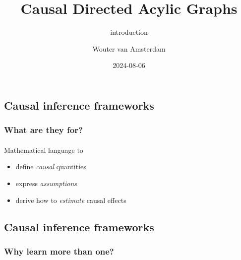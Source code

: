 \documentclass[
  letterpaper,
  DIV=11,
  numbers=noendperiod]{scrartcl}
\title{Causal Directed Acylic Graphs}
\subtitle{introduction}
\author{Wouter van Amsterdam}
\date{2024-08-06}
\makeatletter
\let\oldparagraph\paragraph
\renewcommand{\paragraph}{
    \@ifstar
      \xxxParagraphStar
      \xxxParagraphNoStar
  }
\newcommand{\xxxParagraphStar}[1]{\oldparagraph*{#1}\mbox{}}
\newcommand{\xxxParagraphNoStar}[1]{\oldparagraph{#1}\mbox{}}
\providecommand{\tightlist}{%
  \setlength{\itemsep}{0pt}\setlength{\parskip}{0pt}}\usepackage{longtable,booktabs,array}
\renewcommand*\contentsname{Table of contents}
\newcommand\contentsname{Table of contents}
\makeatother
\begin{document}
\maketitle

\renewcommand*\contentsname{Table of contents}
{
\hypersetup{linkcolor=}
\setcounter{tocdepth}{1}
\tableofcontents
}

\subsection{Causal inference
frameworks}\label{causal-inference-frameworks}

\subsubsection{What are they for?}\label{what-are-they-for}

\paragraph{Mathematical language to}\label{mathematical-language-to}

\begin{itemize}
\tightlist
\item
  define \emph{causal} quantities
\item
  express \emph{assumptions}
\item
  derive how to \emph{estimate} causal effects
\end{itemize}

\subsection{Causal inference
frameworks}\label{causal-inference-frameworks-1}

\subsubsection{Why learn more than one?}\label{why-learn-more-than-one}
\end{document}

